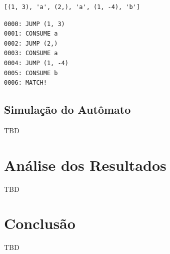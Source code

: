 \documentclass[a4paper,12pt,oneside,onecolumn]{uerj}
\begin{document}
{
  \lstset{%
    basicstyle=\ttfamily\normalsize,
  }
  \begin{lstlisting}[caption={Representação do autômato como array},label=lst:automaton_array]
	[(1, 3), 'a', (2,), 'a', (1, -4), 'b']
  \end{lstlisting}
}

{
  \lstset{%
    basicstyle=\ttfamily\normalsize,
  }
  \begin{lstlisting}[caption={Representação do autômato como instruções},label=lst:automaton_instr]
0000: JUMP (1, 3)
0001: CONSUME a
0002: JUMP (2,)
0003: CONSUME a
0004: JUMP (1, -4)
0005: CONSUME b
0006: MATCH!
  \end{lstlisting}
}


\section{Simulação do Autômato}

TBD


\chapter{Análise dos Resultados}

TBD

\chapter{Conclusão}

TBD

\backmatter

\appendix

\label{app:full_source}
\end{document}
